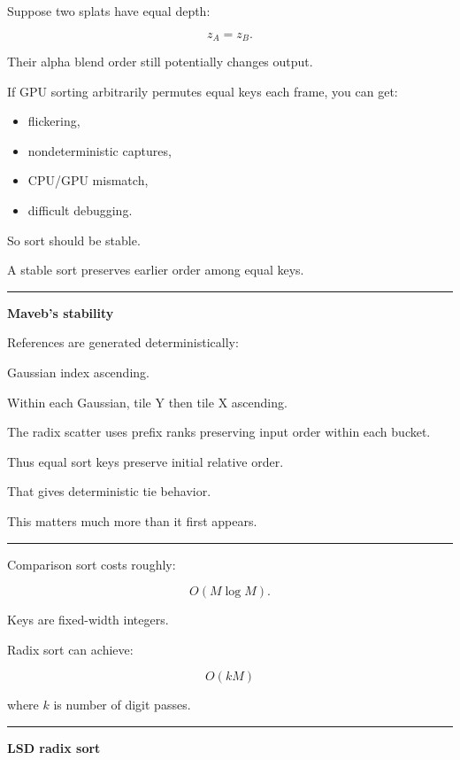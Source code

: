 Suppose two splats have equal depth:

\[
z_A=z_B.
\]

Their alpha blend order still potentially changes output.

If GPU sorting arbitrarily permutes equal keys each frame, you can get:

\begin{itemize}
\tightlist
\item
  flickering,
\item
  nondeterministic captures,
\item
  CPU/GPU mismatch,
\item
  difficult debugging.
\end{itemize}

So sort should be stable.

A stable sort preserves earlier order among equal keys.

\begin{center}\rule{0.5\linewidth}{0.5pt}\end{center}

\textbf{Maveb's stability}

References are generated deterministically:

Gaussian index ascending.

Within each Gaussian, tile Y then tile X ascending.

The radix scatter uses prefix ranks preserving input order within each bucket.

Thus equal sort keys preserve initial relative order.

That gives deterministic tie behavior.

This matters much more than it first appears.

\begin{center}\rule{0.5\linewidth}{0.5pt}\end{center}

Comparison sort costs roughly:

\[
O(M\log M).
\]

Keys are fixed-width integers.

Radix sort can achieve:

\[
O(kM)
\]

where \(k\) is number of digit passes.

\begin{center}\rule{0.5\linewidth}{0.5pt}\end{center}

\textbf{LSD radix sort}

